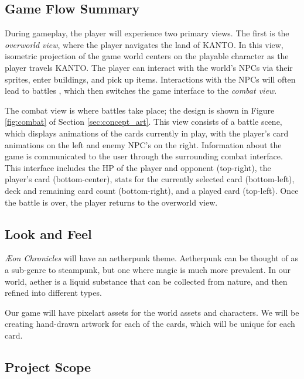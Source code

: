 \documentclass[12pt,titlepage]{article}
\newcommand\world{KANTO\xspace}
\newcommand\gametitle{\textit{\AE on Chronicles}\xspace}
\begin{document}
\subsection{Game Flow Summary}
\label{sec:game_flow_summary}

During gameplay, the player will experience two primary views. The first is the
{\it overworld view}, where the player navigates the land of \world. In this
view, isometric projection of the game world centers on the playable character
as the player travels \world. The player can interact with the world's NPCs via
their sprites, enter buildings, and pick up items. Interactions with the NPCs
will often lead to battles , which then switches the game interface to
the {\it combat view}.

The combat view is where battles take place; the design is shown in
Figure \ref{fig:combat} of Section \ref{sec:concept_art}. This view consists of
a battle scene, which displays animations of the cards currently in play, with
the player's card animations on the left and enemy NPC's on the right.
Information about the game is communicated to the user through the surrounding
combat interface. This interface includes the HP of the player and opponent
(top-right), the player's card (bottom-center), stats for the currently selected
card (bottom-left), deck and remaining card count (bottom-right), and a played
card (top-left). Once the battle is over, the player returns to the overworld
view.

\subsection{Look and Feel}
\gametitle will have an aetherpunk theme. Aetherpunk can be thought of as a
sub-genre to steampunk, but one where magic is much more prevalent. In our world,
aether is a liquid substance that can be collected from nature, and then refined
into different types.

Our game will have pixelart assets for the world assets and characters. We will
be creating hand-drawn artwork for each of the cards, which will be unique for
each card.

\subsection{Project Scope}
%
\end{document}
